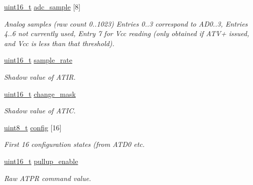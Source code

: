 \begin{DoxyCompactItemize}
\hyperlink{group__hal__dos_ga5a8b2dc9e45a9ee81a94ef304fb62505}{uint16\+\_\+t} \hyperlink{group__xbee__io_ga51a638af480039b3c6578b36b5ad44f0}{adc\+\_\+sample} \mbox{[}8\mbox{]}
\begin{DoxyCompactList}\small\item\em Analog samples (raw count 0..1023) Entries 0..3 correspond to A\+D0..3, Entries 4..6 not currently used, Entry 7 for Vcc reading (only obtained if A\+T\+V+ issued, and Vcc is less than that threshold). \end{DoxyCompactList}\item 
\mbox{\label{group__xbee__io_ga55f35df829432e5948124c79e1cda4d9}} 
\hyperlink{group__hal__dos_ga5a8b2dc9e45a9ee81a94ef304fb62505}{uint16\+\_\+t} \hyperlink{group__xbee__io_ga55f35df829432e5948124c79e1cda4d9}{sample\+\_\+rate}
\begin{DoxyCompactList}\small\item\em Shadow value of A\+T\+IR. \end{DoxyCompactList}\item 
\mbox{\label{group__xbee__io_ga2502e2e5a62801d202ac0cb63e546e46}} 
\hyperlink{group__hal__dos_ga5a8b2dc9e45a9ee81a94ef304fb62505}{uint16\+\_\+t} \hyperlink{group__xbee__io_ga2502e2e5a62801d202ac0cb63e546e46}{change\+\_\+mask}
\begin{DoxyCompactList}\small\item\em Shadow value of A\+T\+IC. \end{DoxyCompactList}\item 
\hyperlink{group__hal__dos_gae1affc9ca37cfb624959c866a73f83c2}{uint8\+\_\+t} \hyperlink{group__xbee__io_ga46d8dea1f8c2a731faf0db27d6ed308f}{config} \mbox{[}16\mbox{]}
\begin{DoxyCompactList}\small\item\em First 16 configuration states (from A\+T\+D0 etc. \end{DoxyCompactList}\item 
\mbox{\label{group__xbee__io_ga059172dae4cbb97d22755682ec824079}} 
\hyperlink{group__hal__dos_ga5a8b2dc9e45a9ee81a94ef304fb62505}{uint16\+\_\+t} \hyperlink{group__xbee__io_ga059172dae4cbb97d22755682ec824079}{pullup\+\_\+enable}
\begin{DoxyCompactList}\small\item\em Raw A\+T\+PR command value. \end{DoxyCompactList}\item 

\end{DoxyCompactItemize}
